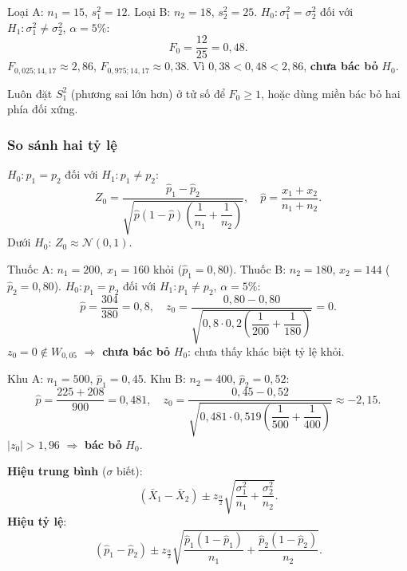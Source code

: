 \documentclass[12pt,a4paper]{article}
\begin{document}
\begin{vidu}[title={So sánh độ phân tán năng suất hai loại cây}]
Loại A: $n_1=15$, $s_1^2=12$. Loại B: $n_2=18$, $s_2^2=25$. $H_0: \sigma_1^2=\sigma_2^2$ đối với $H_1: \sigma_1^2 \ne \sigma_2^2$, $\alpha=5\%$:
\[
  F_0 = \dfrac{12}{25} = 0{,}48.
\]
$F_{0{,}025;14,17} \approx 2{,}86$, $F_{0{,}975;14,17} \approx 0{,}38$. Vì $0{,}38 < 0{,}48 < 2{,}86$, \textbf{chưa bác bỏ} $H_0$.
\end{vidu}

\begin{luuy}[title={Thứ tự F}]
Luôn đặt $S_1^2$ (phương sai lớn hơn) ở tử số để $F_0 \ge 1$, hoặc dùng miền bác bỏ hai phía đối xứng.
\end{luuy}

\subsubsection{So sánh hai tỷ lệ}

\begin{congthuc}[title={Kiểm định hai tỷ lệ - mẫu lớn}]
  $H_0: p_1 = p_2$ đối với $H_1: p_1 \ne p_2$:
  \[
    Z_0 = \dfrac{\hat{p}_1 - \hat{p}_2}{\sqrt{\hat{p}(1-\hat{p})(\dfrac{1}{n_1} + \dfrac{1}{n_2})}}, \quad
    \hat{p} = \dfrac{x_1 + x_2}{n_1 + n_2}.
  \]
  Dưới $H_0$: $Z_0 \approx \mathcal{N}(0,1)$.
\end{congthuc}

\begin{vidu}[title={So sánh tỷ lệ khỏi bệnh hai thuốc}]
Thuốc A: $n_1=200$, $x_1=160$ khỏi ($\hat{p}_1=0{,}80$). Thuốc B: $n_2=180$, $x_2=144$ ($\hat{p}_2=0{,}80$).
$H_0: p_1=p_2$ đối với $H_1: p_1 \ne p_2$, $\alpha=5\%$:
\[
  \hat{p} = \dfrac{304}{380} = 0{,}8, \quad
  z_0 = \dfrac{0{,}80-0{,}80}{\sqrt{0{,}8\cdot 0{,}2(\dfrac{1}{200}+\dfrac{1}{180})}} = 0.
\]
$z_0 = 0 \notin W_{0{,}05}$ $\Rightarrow$ \textbf{chưa bác bỏ} $H_0$: chưa thấy khác biệt tỷ lệ khỏi.
\end{vidu}

\begin{vidu}[title={So sánh tỷ lệ ủng hộ hai khu vực}]
Khu A: $n_1=500$, $\hat{p}_1=0{,}45$. Khu B: $n_2=400$, $\hat{p}_2=0{,}52$:
\[
  \hat{p} = \dfrac{225+208}{900} = 0{,}481, \quad
  z_0 = \dfrac{0{,}45-0{,}52}{\sqrt{0{,}481\cdot 0{,}519(\dfrac{1}{500}+\dfrac{1}{400})}} \approx -2{,}15.
\]
$|z_0| > 1{,}96$ $\Rightarrow$ \textbf{bác bỏ} $H_0$.
\end{vidu}

\begin{congthuc}[title={KTC cho $\mu_1 - \mu_2$ và $p_1 - p_2$}]
  \textbf{Hiệu trung bình} ($\sigma$ biết):
  \[
    (\bar{X}_1-\bar{X}_2) \pm z_{\frac{\alpha}{2}}\sqrt{\dfrac{\sigma_1^2}{n_1} + \dfrac{\sigma_2^2}{n_2}}.
  \]
  \textbf{Hiệu tỷ lệ}:
  \[
    (\hat{p}_1-\hat{p}_2) \pm z_{\frac{\alpha}{2}}\sqrt{\dfrac{\hat{p}_1(1-\hat{p}_1)}{n_1} + \dfrac{\hat{p}_2(1-\hat{p}_2)}{n_2}}.
  \]
\end{congthuc}
\end{document}
